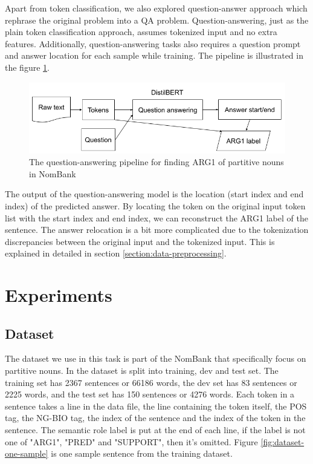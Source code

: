 \documentclass[11pt]{article}
\begin{document}
Apart from token classification, we also explored question-answer approach which rephrase the original problem into a QA problem. Question-answering, just as the plain token classification approach, assumes tokenized input and no extra features. Additionally, question-answering tasks also requires a question prompt and answer location for each sample while training. The pipeline is illustrated in the figure \ref{fig:qa-arg1-pipeline}.

\begin{figure}[h]
  \centering
  \includegraphics[width=\linewidth]{assets/qa-arg1-pipeline.png}
  \caption{The question-answering pipeline for finding ARG1 of partitive nouns in NomBank}
  \label{fig:qa-arg1-pipeline}
\end{figure}

The output of the question-answering model is the location (start index and end index) of the predicted answer. By locating the token on the original input token list with the start index and end index, we can reconstruct the ARG1 label of the sentence. The answer relocation is a bit more complicated due to the tokenization discrepancies between the original input and the tokenized input. This is explained in detailed in section \ref{section:data-preprocessing}.

\section{Experiments}

\subsection{Dataset}

The dataset we use in this task is part of the NomBank that specifically focus on partitive nouns. In the dataset is split into training, dev and test set. The training set has 2367 sentences or 66186 words, the dev set has 83 sentences or 2225 words, and the test set has 150 sentences or 4276 words. Each token in a sentence takes a line in the data file, the line containing the token itself, the POS tag, the NG-BIO tag, the index of the sentence and the index of the token in the sentence. The semantic role label is put at the end of each line, if the label is not one of "ARG1", "PRED" and "SUPPORT", then it's omitted. Figure \ref{fig:dataset-one-sample} is one sample sentence from the training dataset.
\end{document}
